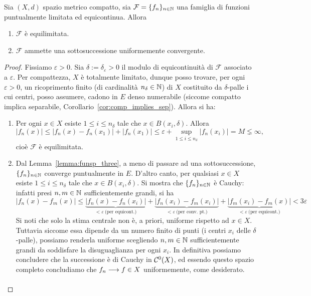 \begin{theorem}
	Sia $(X,d)$ spazio metrico compatto, sia $\mathcal F =\{f_n\}_{n \in \mathbb{N}}$ una famiglia di funzioni puntualmente limitata ed equicontinua.
	Allora
	\begin{enumerate}
		\item $\mathcal F$ è equilimitata.
		\item $\mathcal F$ ammette una sottosuccessione uniformemente convergente.
	\end{enumerate}
\end{theorem}
\begin{proof}
	Fissiamo $\varepsilon > 0$. Sia $\delta := \delta_\varepsilon > 0$ il modulo di equicontinuità di $\mathcal F$ associato a $\varepsilon$.
	Per compattezza, $X$ è totalmente limitato, dunque posso trovare, per ogni $\varepsilon > 0$, un ricoprimento finito (di cardinalità $n_\delta \in \mathbb{N}$) di $X$ costituito da $\delta$-palle i cui centri, posso assumere, cadono in $E$ denso numerabile (siccome compatto implica separabile, Corollario~\ref{cor:comp_implies_sep}).
	Allora si ha:
	\begin{enumerate}
		\item Per ogni $x \in X$ esiste $1 \leq i \leq n_\delta$ tale che $x \in B(x_i, \delta)$. Allora
		\begin{equation*}
			|f_n(x)| \leq |f_n(x) - f_n(x_1)| + |f_n(x_1)| \leq \varepsilon + \sup_{1 \leq i \leq n_\delta} |f_n(x_i)| = M \lneq \infty,
		\end{equation*}
		cioè $\mathcal F$ è equilimitata.

		\item Dal Lemma~\ref{lemma:funsp_three}, a meno di passare ad una sottosuccessione, $\{f_n\}_{n \in \mathbb{N}}$ converge puntualmente in $E$. D'altro canto, per qualsiasi $x \in X$ esiste $1 \leq i \leq n_\delta$ tale che $x \in B(x_i, \delta)$. Si mostra che $\{f_n\}_{n \in \mathbb{N}}$ è Cauchy: infatti presi $n,m \in \mathbb{N}$ sufficientemente grandi, si ha
		\begin{equation*}
			|f_n(x) - f_m(x)| \leq \underbrace{|f_n(x)-f_n(x_i)|}_{< \varepsilon\ \text{(per equicont.)}} + \underbrace{|f_n(x_i) - f_m(x_i)|}_{< \varepsilon\ \text{(per conv. pt.)}} + \underbrace{|f_m(x_i) - f_m(x)|}_{< \varepsilon\ \text{(per equicont.)}} < 3\varepsilon
		\end{equation*}
		Si noti che solo la stima centrale non è, a priori, uniforme rispetto ad $x \in X$.
		Tuttavia siccome essa dipende da un numero finito di punti (i centri $x_i$ delle $\delta$-palle), possiamo renderla uniforme scegliendo $n,m \in \mathbb{N}$ sufficientemente grandi da soddisfare la disuguaglianza per ogni $x_i$.
		In definitiva possiamo concludere che la successione è di Cauchy in $\mathcal{C}^0(X)$, ed essendo questo spazio completo concludiamo che $f_n \underset{{}}{\longrightarrow} f \in X$ uniformemente, come desiderato.
	\end{enumerate}
\end{proof}

